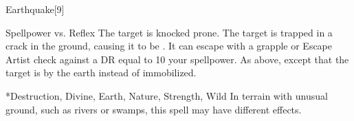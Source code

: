 \begin{spellsection}{Earthquake}[9]
    \begin{spellheader}
    \end{spellheader}
    \begin{spellcontent}
        \begin{spelltargetinginfo}
        \end{spelltargetinginfo}
        \begin{spelleffects}
            \begin{spellattack}{Spellpower vs. Reflex}
                \spelleffect The target is knocked prone.
                \spellsuccess The target is trapped in a crack in the ground, causing it to be \immobilized. It can escape with a grapple or Escape Artist check against a DR equal to 10 \add your spellpower.
                \spellcritical As above, except that the target is \grappled by the earth instead of immobilized.
            \end{spellattack}
        \end{spelleffects}
    \end{spellcontent}
    \begin{spellfooter}
        *{Destruction, Divine, Earth, Nature, Strength, Wild}
        \spellnotes In terrain with unusual ground, such as rivers or swamps, this spell may have different effects.

        \physicalspellnotes
        \miscastyou
    \end{spellfooter}
\end{spellsection}

